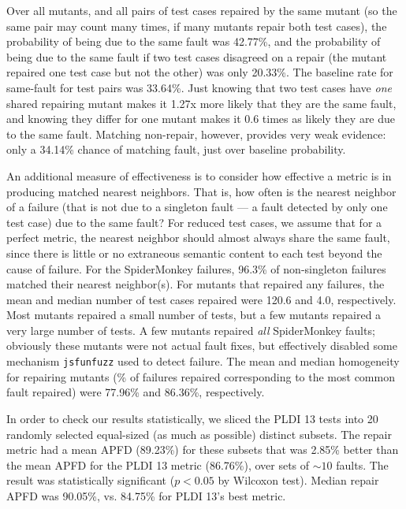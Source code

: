 Over all mutants, and all pairs of test cases repaired by the same mutant (so the same pair may count many times, if many mutants repair both test cases), the probability of being due to the same fault was 42.77\%, and the probability of being due to the same fault if two test cases disagreed on a repair (the mutant repaired one test case but not the other) was only 20.33\%.  The baseline rate for same-fault for test pairs was 33.64\%.  Just knowing that two test cases have \emph{one} shared repairing mutant makes it 1.27x more likely that they are the same fault, and knowing they differ for one mutant makes it 0.6 times as likely they are due to the same fault.  Matching non-repair, however, provides very weak evidence:  only a 34.14\% chance of matching fault, just over baseline probability.

An additional measure of effectiveness is to consider how effective a metric is in producing matched nearest neighbors.  That is, how often is the nearest neighbor of a failure (that is not due to a singleton fault --- a fault detected by only one test case) due to the same fault?  For reduced \cite{DD,PLDI13,
CReduce} test cases, we assume that for a perfect metric, the nearest neighbor should almost always share the same fault, since there is little or no extraneous semantic content to each test beyond the cause of failure.  For the SpiderMonkey failures, 96.3\% of non-singleton failures matched their nearest neighbor(s).  For mutants that repaired any failures, the mean and median number of test cases repaired were 120.6 and 4.0, respectively.  Most mutants repaired a small number of tests, but a few mutants repaired a very large number of tests.  A few mutants repaired \emph{all} SpiderMonkey faults; obviously these mutants were not actual fault fixes, but effectively disabled some mechanism {\tt jsfunfuzz} used to detect failure. The mean and median homogeneity for repairing mutants (\% of failures repaired corresponding to the most common fault repaired) were 77.96\% and 86.36\%, respectively.  

In order to check our results statistically, we sliced the PLDI 13 tests into 20 randomly selected equal-sized (as much as possible) distinct subsets.  The repair metric had a mean APFD (89.23\%) for these subsets that was 2.85\% better than the mean APFD for the PLDI 13 metric (86.76\%), over sets of $\sim 10$ faults. The result was statistically significant ($p < 0.05$ by Wilcoxon test).   Median repair APFD was 90.05\%, vs. 84.75\% for PLDI 13's best metric.



